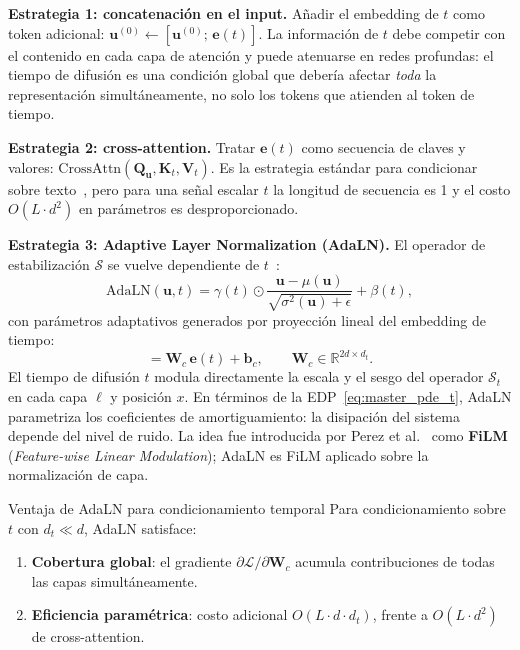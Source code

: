 \medskip
\noindent\textbf{Estrategia 1: concatenación en el input.}
Añadir el embedding de $t$ como token adicional:
$\bm{u}^{(0)} \leftarrow [\bm{u}^{(0)};\,\bm{e}(t)]$. La
información de $t$ debe competir con el contenido en cada capa de
atención y puede atenuarse en redes profundas: el tiempo de
difusión es una condición global que debería afectar \emph{toda}
la representación simultáneamente, no solo los tokens que atienden
al token de tiempo.

\medskip
\noindent\textbf{Estrategia 2: cross-attention.}
Tratar $\bm{e}(t)$ como secuencia de claves y valores:
$\mathrm{CrossAttn}(\bm{Q}_{\bm{u}}, \bm{K}_t, \bm{V}_t)$.
Es la estrategia estándar para condicionar sobre
texto~\cite{rombach2022ldm}, pero para una señal escalar $t$ la
longitud de secuencia es 1 y el costo $O(L \cdot d^2)$ en
parámetros es desproporcionado.

\medskip
\noindent\textbf{Estrategia 3: Adaptive Layer Normalization (AdaLN).}
El operador de estabilización $\mathcal{S}$ se vuelve dependiente
de $t$~\cite{perez2018film, peebles2023dit}:
\begin{equation}
  \mathrm{AdaLN}(\bm{u}, t)
  = \gamma(t) \odot
    \frac{\bm{u} - \mu(\bm{u})}{\sqrt{\sigma^2(\bm{u}) + \epsilon}}
  + \beta(t),
  \label{eq:adialn}
\end{equation}
con parámetros adaptativos generados por proyección lineal del
embedding de tiempo:
\begin{equation}
  [\gamma(t);\,\beta(t)]
  = \bm{W}_c\,\bm{e}(t) + \bm{b}_c,
  \qquad \bm{W}_c \in \mathbb{R}^{2d \times d_t}.
  \label{eq:adialn_proj}
\end{equation}
El tiempo de difusión $t$ modula directamente la escala y el
sesgo del operador $\mathcal{S}_t$ en cada capa $\ell$ y posición
$x$. En términos de la EDP~\eqref{eq:master_pde_t}, AdaLN
parametriza los coeficientes de amortiguamiento: la disipación
del sistema depende del nivel de ruido. La idea fue introducida
por Perez et al.~\cite{perez2018film} como \textbf{FiLM}
(\textit{Feature-wise Linear Modulation}); AdaLN es FiLM
aplicado sobre la normalización de capa.

\begin{proposicion}{Ventaja de AdaLN para condicionamiento temporal}
\label{prop:adialn_ventaja}
Para condicionamiento sobre $t$ con $d_t \ll d$, AdaLN satisface:
\begin{enumerate}
  \item \textbf{Cobertura global}: el gradiente
        $\partial\mathcal{L}/\partial\bm{W}_c$ acumula
        contribuciones de todas las capas simultáneamente.
  \item \textbf{Eficiencia paramétrica}: costo adicional
        $O(L \cdot d \cdot d_t)$, frente a $O(L \cdot d^2)$
        de cross-attention.
\end{enumerate}
\end{proposicion}

